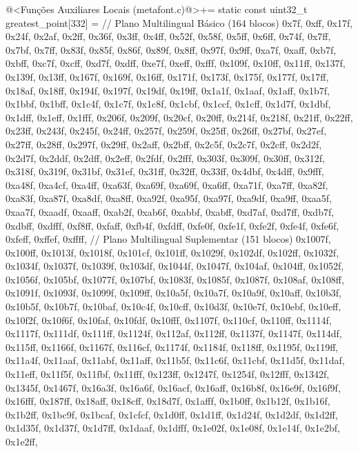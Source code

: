 {{{{{{\iniciocodigo
@<Funções Auxiliares Locais (metafont.c)@>+=
static const uint32_t greatest_point[332] = {
  // Plano Multilingual Básico (164 blocos)
0x7f, 0xff, 0x17f, 0x24f, 0x2af, 0x2ff, 0x36f, 0x3ff, 0x4ff, 0x52f,
0x58f, 0x5ff, 0x6ff, 0x74f, 0x7ff, 0x7bf, 0x7ff, 0x83f, 0x85f, 0x86f,
0x89f, 0x8ff, 0x97f, 0x9ff, 0xa7f, 0xaff, 0xb7f, 0xbff, 0xc7f, 0xcff,
0xd7f, 0xdff, 0xe7f, 0xeff, 0xfff, 0x109f, 0x10ff, 0x11ff, 0x137f, 0x139f,
0x13ff, 0x167f, 0x169f, 0x16ff, 0x171f, 0x173f, 0x175f, 0x177f, 0x17ff, 0x18af,
0x18ff, 0x194f, 0x197f, 0x19df, 0x19ff, 0x1a1f, 0x1aaf, 0x1aff, 0x1b7f, 0x1bbf,
0x1bff, 0x1c4f, 0x1c7f, 0x1c8f, 0x1cbf, 0x1ccf, 0x1cff, 0x1d7f, 0x1dbf, 0x1dff,
0x1eff, 0x1fff, 0x206f, 0x209f, 0x20cf, 0x20ff, 0x214f, 0x218f, 0x21ff, 0x22ff,
0x23ff, 0x243f, 0x245f, 0x24ff, 0x257f, 0x259f, 0x25ff, 0x26ff, 0x27bf, 0x27ef,
0x27ff, 0x28ff, 0x297f, 0x29ff, 0x2aff, 0x2bff, 0x2c5f, 0x2c7f, 0x2cff, 0x2d2f,
0x2d7f, 0x2ddf, 0x2dff, 0x2eff, 0x2fdf, 0x2fff, 0x303f, 0x309f, 0x30ff, 0x312f,
0x318f, 0x319f, 0x31bf, 0x31ef, 0x31ff, 0x32ff, 0x33ff, 0x4dbf, 0x4dff, 0x9fff,
0xa48f, 0xa4cf, 0xa4ff, 0xa63f, 0xa69f, 0xa69f, 0xa6ff, 0xa71f, 0xa7ff, 0xa82f,
0xa83f, 0xa87f, 0xa8df, 0xa8ff, 0xa92f, 0xa95f, 0xa97f, 0xa9df, 0xa9ff, 0xaa5f,
0xaa7f, 0xaadf, 0xaaff, 0xab2f, 0xab6f, 0xabbf, 0xabff, 0xd7af, 0xd7ff, 0xdb7f,
0xdbff, 0xdfff, 0xf8ff, 0xfaff, 0xfb4f, 0xfdff, 0xfe0f, 0xfe1f, 0xfe2f, 0xfe4f,
0xfe6f, 0xfeff, 0xffef, 0xffff,
  // Plano Multilingual Suplementar (151 blocos)
0x1007f, 0x100ff, 0x1013f, 0x1018f, 0x101cf, 0x101ff, 0x1029f, 0x102df,
0x102ff, 0x1032f, 0x1034f, 0x1037f, 0x1039f, 0x103df, 0x1044f, 0x1047f,
0x104af, 0x104ff, 0x1052f, 0x1056f, 0x105bf, 0x1077f, 0x107bf, 0x1083f,
0x1085f, 0x1087f, 0x108af, 0x108ff, 0x1091f, 0x1093f, 0x1099f, 0x109ff,
0x10a5f, 0x10a7f, 0x10a9f, 0x10aff, 0x10b3f, 0x10b5f, 0x10b7f, 0x10baf,
0x10c4f, 0x10cff, 0x10d3f, 0x10e7f, 0x10ebf, 0x10eff, 0x10f2f, 0x10f6f,
0x10faf, 0x10fdf, 0x10fff, 0x1107f, 0x110cf, 0x110ff, 0x1114f, 0x1117f,
0x111df, 0x111ff, 0x1124f, 0x112af, 0x112ff, 0x1137f, 0x1147f, 0x114df,
0x115ff, 0x1166f, 0x1167f, 0x116cf, 0x1174f, 0x1184f, 0x118ff, 0x1195f,
0x119ff, 0x11a4f, 0x11aaf, 0x11abf, 0x11aff, 0x11b5f, 0x11c6f, 0x11cbf,
0x11d5f, 0x11daf, 0x11eff, 0x11f5f, 0x11fbf, 0x11fff, 0x123ff, 0x1247f,
0x1254f, 0x12fff, 0x1342f, 0x1345f, 0x1467f, 0x16a3f, 0x16a6f, 0x16acf,
0x16aff, 0x16b8f, 0x16e9f, 0x16f9f, 0x16fff, 0x187ff, 0x18aff, 0x18cff,
0x18d7f, 0x1afff, 0x1b0ff, 0x1b12f, 0x1b16f, 0x1b2ff, 0x1bc9f, 0x1bcaf,
0x1cfcf, 0x1d0ff, 0x1d1ff, 0x1d24f, 0x1d2df, 0x1d2ff, 0x1d35f, 0x1d37f,
0x1d7ff, 0x1daaf, 0x1dfff, 0x1e02f, 0x1e08f, 0x1e14f, 0x1e2bf, 0x1e2ff,
}}}}}}}
